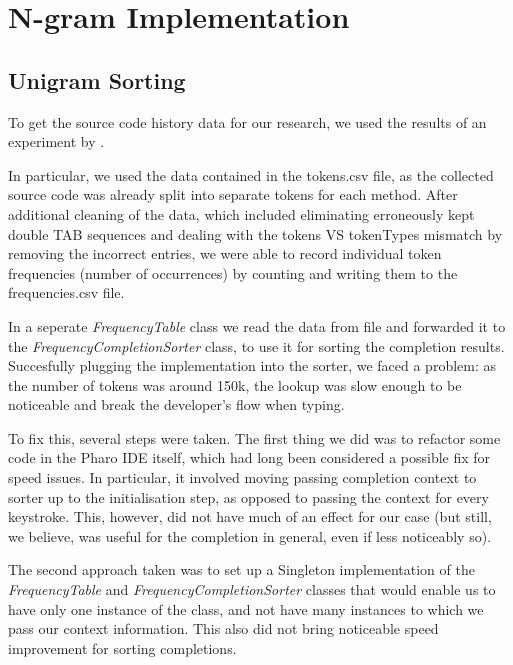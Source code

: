 \chapter{N-gram Implementation}
\label{chap:N-gram Implementation}

\section{}


\section{Unigram Sorting}
To get the source code history data for our research, we used the results of an experiment by \cite{Zait20a}. 

In particular, we used the data contained in the tokens.csv file, as the collected source code was already split into separate tokens for each method. After additional cleaning of the data, which included eliminating erroneously kept double TAB sequences and dealing with the tokens VS tokenTypes mismatch by removing the incorrect entries, we were able to record individual token frequencies (number of occurrences) by counting and writing them to the frequencies.csv file.

In a seperate \textit{FrequencyTable} class we read the data from file and forwarded it to the \textit{FrequencyCompletionSorter} class, to use it for sorting the completion results. Succesfully plugging the implementation into the sorter, we faced a problem: as the number of tokens was around 150k, the lookup was slow enough to be noticeable and break the developer's flow when typing. 

To fix this, several steps were taken. The first thing we did was to refactor some code in the Pharo IDE itself, which had long been considered a possible fix for speed issues. In particular, it involved moving passing completion context to sorter up to the initialisation step, as opposed to passing the context for every keystroke. This, however, did not have much of an effect for our case (but still, we believe, was useful for the completion in general, even if less noticeably so).

The second approach taken was to set up a Singleton implementation of the \textit{FrequencyTable} and \textit{FrequencyCompletionSorter} classes that would enable us to have only one instance of the class, and not have many instances to which we pass our context information. This also did not bring noticeable speed improvement for sorting completions.

